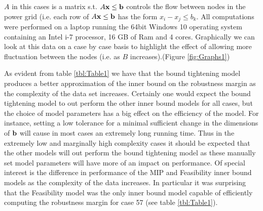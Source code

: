 $A$ in this cases is a matrix s.t. $A\bold x\leq \bold b$ controls the flow between nodes in the power grid (i.e. each row of $A\bold x\leq \bold b$ has the form $x_i-x_j\leq b_k$. 
All computations were performed on a laptop running the 64bit Windows 10 operating system containing an Intel i-7 processor, 16 GB of Ram and 4 cores. 
Graphically we can look at this data on a case by case basis to highlight the effect of allowing more fluctuation between the nodes (i.e. as $B$ increases).(Figure \ref{fig:Graphs1}) 




As evident from table \ref{tbl:Table1} we have that the bound tightening model produces a better approximation of the inner bound on the robustness margin as the complexity of the data set increases. 
Certainly one would expect the bound tightening model to out perform the other inner bound models for all cases, but the choice of model parameters has a big effect on the efficiency of the model. 
For instance, setting a low tolerance for a minimal sufficient change in the dimensions of $\bold b$ will cause in most cases an extremely long running time. 
Thus in the extremely low and marginally high complexity cases it should be expected that the other models will out perform the bound tightening model as these manually set model parameters will have more of an impact on performance. 
Of special interest is the difference in performance of the MIP and Feasibility inner bound models as the complexity of the data increases. 
In particular it was surprising that the Feasibility model was the only inner bound model capable of efficiently computing the robustness margin for case 57 (see table \ref{tbl:Table1}). 
